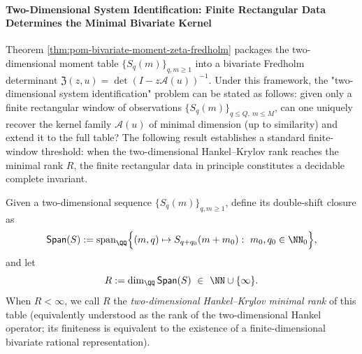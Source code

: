 
\paragraph{Two-Dimensional System Identification: Finite Rectangular Data Determines the Minimal Bivariate Kernel}
Theorem \ref{thm:pom-bivariate-moment-zeta-fredholm} packages the two-dimensional moment table \(\{S_q(m)\}_{q,m\ge1}\) into a bivariate Fredholm determinant
\(
\mathfrak{Z}(z,u)=\det(I-z\mathcal{A}(u))^{-1}
\).
Under this framework, the "two-dimensional system identification" problem can be stated as follows: given only a finite rectangular window of observations \(\{S_q(m)\}_{q\le Q,\ m\le M}\), can one uniquely recover the kernel family \(\mathcal{A}(u)\) of minimal dimension (up to similarity) and extend it to the full table?
The following result establishes a standard finite-window threshold: when the two-dimensional Hankel--Krylov rank reaches the minimal rank \(R\), the finite rectangular data in principle constitutes a decidable complete invariant.
\begin{definition}\label{def:pom-bivariate-hankel-krylov-rank}
Given a two-dimensional sequence \(\{S_q(m)\}_{q,m\ge1}\),
define its double-shift closure as
\[
\mathsf{Span}(S):=\mathrm{span}_{\QQ}\Bigl\{(m,q)\mapsto S_{q+q_0}(m+m_0):\ m_0,q_0\in\NN_0\Bigr\},
\]
and let
\[
R:=\dim_{\QQ}\mathsf{Span}(S)\ \in\ \NN\cup\{\infty\}.
\]
When \(R<\infty\), we call \(R\) the \emph{two-dimensional Hankel--Krylov minimal rank} of this table (equivalently understood as the rank of the two-dimensional Hankel operator; its finiteness is equivalent to the existence of a finite-dimensional bivariate rational representation).
\end{definition}
